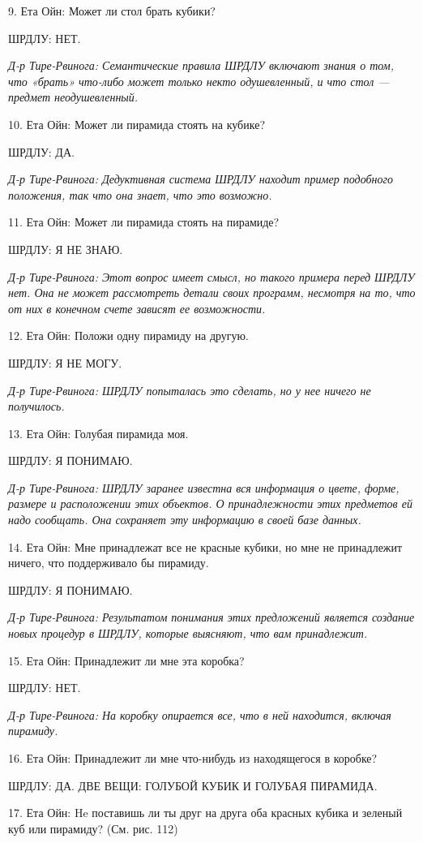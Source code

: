 9. Ета Ойн: Может ли стол брать кубики?

ШРДЛУ: НЕТ.

\emph{Д-р Тире-Рвинога: Семантические правила ШРДЛУ включают знания о том, что «брать» что-либо может только некто одушевленный, и что стол --- предмет неодушевленный.}

10. Ета Ойн: Может ли пирамида стоять на кубике?

ШРДЛУ: ДА.

\emph{Д-р Тире-Рвинога: Дедуктивная система ШРДЛУ находит пример подобного положения, так что она знает, что это возможно.}

11. Ета Ойн: Может ли пирамида стоять на пирамиде?

ШРДЛУ: Я НЕ ЗНАЮ.

\emph{Д-р Тире-Рвинога: Этот вопрос имеет смысл, но такого примера перед ШРДЛУ нет. Она не может рассмотреть детали своих программ, несмотря на то, что от них в конечном счете зависят ее возможности.}

12. Ета Ойн: Положи одну пирамиду на другую.

ШРДЛУ: Я НЕ МОГУ.

\emph{Д-р Тире-Рвинога: ШРДЛУ попыталась это сделать, но у нее ничего не получилось.}

13. Ета Ойн: Голубая пирамида моя.

ШРДЛУ: Я ПОНИМАЮ.

\emph{Д-р Тире-Рвинога: ШРДЛУ заранее известна вся информация о цвете, форме, размере и расположении этих объектов. О принадлежности этих предметов ей надо сообщать. Она сохраняет эту информацию в своей базе данных.}

14. Ета Ойн: Мне принадлежат все не красные кубики, но мне не принадлежит ничего, что поддерживало бы пирамиду.

ШРДЛУ: Я ПОНИМАЮ.

\emph{Д-р Тире-Рвинога: Результатом понимания этих предложений является создание новых процедур в ШРДЛУ, которые выясняют, что вам принадлежит.}

15. Ета Ойн: Принадлежит ли мне эта коробка?

ШРДЛУ: НЕТ.

\emph{Д-р Тире-Рвинога: На коробку опирается все, что в ней находится, включая пирамиду.}

16. Ета Ойн: Принадлежит ли мне что-нибудь из находящегося в коробке?

ШРДЛУ: ДА. ДВЕ ВЕЩИ: ГОЛУБОЙ КУБИК И ГОЛУБАЯ ПИРАМИДА.

17. Ета Ойн: He поставишь ли ты друг на друга оба красных кубика и зеленый куб или пирамиду? (См. рис. 112)

